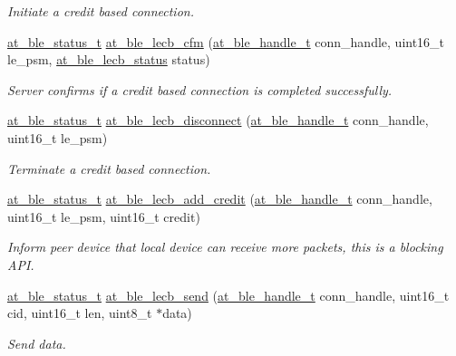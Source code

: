 \begin{DoxyCompactItemize}
\begin{DoxyCompactList}\small\item\em Initiate a credit based connection. \end{DoxyCompactList}\item 
\mbox{\hyperlink{group__error__codes__group_ga3b1db9b95feb157b3c188ca27fe76988}{at\+\_\+ble\+\_\+status\+\_\+t}} \mbox{\hyperlink{group__l2cap__group_gaa0c1f138e2cb7a4f986d6e1b31a44531}{at\+\_\+ble\+\_\+lecb\+\_\+cfm}} (\mbox{\hyperlink{at__ble__api_8h_abd23646d0c662860741f787efc8456f2}{at\+\_\+ble\+\_\+handle\+\_\+t}} conn\+\_\+handle, uint16\+\_\+t le\+\_\+psm, \mbox{\hyperlink{at__ble__api_8h_ad1ded688a1b188cf8e6bac1ab97f276e}{at\+\_\+ble\+\_\+lecb\+\_\+status}} status)
\begin{DoxyCompactList}\small\item\em Server confirms if a credit based connection is completed successfully. \end{DoxyCompactList}\item 
\mbox{\hyperlink{group__error__codes__group_ga3b1db9b95feb157b3c188ca27fe76988}{at\+\_\+ble\+\_\+status\+\_\+t}} \mbox{\hyperlink{group__l2cap__group_ga54fabd178d032ebfb0e401853563e4ae}{at\+\_\+ble\+\_\+lecb\+\_\+disconnect}} (\mbox{\hyperlink{at__ble__api_8h_abd23646d0c662860741f787efc8456f2}{at\+\_\+ble\+\_\+handle\+\_\+t}} conn\+\_\+handle, uint16\+\_\+t le\+\_\+psm)
\begin{DoxyCompactList}\small\item\em Terminate a credit based connection. \end{DoxyCompactList}\item 
\mbox{\hyperlink{group__error__codes__group_ga3b1db9b95feb157b3c188ca27fe76988}{at\+\_\+ble\+\_\+status\+\_\+t}} \mbox{\hyperlink{group__l2cap__group_ga48aebfd5595b6064804c582ecc554bfe}{at\+\_\+ble\+\_\+lecb\+\_\+add\+\_\+credit}} (\mbox{\hyperlink{at__ble__api_8h_abd23646d0c662860741f787efc8456f2}{at\+\_\+ble\+\_\+handle\+\_\+t}} conn\+\_\+handle, uint16\+\_\+t le\+\_\+psm, uint16\+\_\+t credit)
\begin{DoxyCompactList}\small\item\em Inform peer device that local device can receive more packets, this is a blocking A\+PI. \end{DoxyCompactList}\item 
\mbox{\hyperlink{group__error__codes__group_ga3b1db9b95feb157b3c188ca27fe76988}{at\+\_\+ble\+\_\+status\+\_\+t}} \mbox{\hyperlink{group__l2cap__group_ga5fd4f7aa543a232bd7da6eb25c1df727}{at\+\_\+ble\+\_\+lecb\+\_\+send}} (\mbox{\hyperlink{at__ble__api_8h_abd23646d0c662860741f787efc8456f2}{at\+\_\+ble\+\_\+handle\+\_\+t}} conn\+\_\+handle, uint16\+\_\+t cid, uint16\+\_\+t len, uint8\+\_\+t $\ast$data)
\begin{DoxyCompactList}\small\item\em Send data. \end{DoxyCompactList}\end{DoxyCompactItemize}



